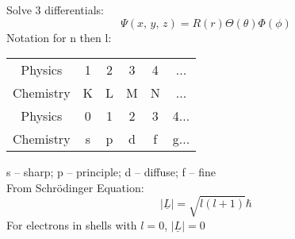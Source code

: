 \documentclass[a4paper, 11pt, fleqn, normalem]{report}
\begin{document}
Solve 3 differentials:
\begin{equation*}
    \Psi(x,\,y,\,z) = R(r)\Theta(\theta)\Phi(\phi)
\end{equation*}
Notation for n then l:
\begin{table}[H]
    \begin{tabular}{c|ccccc}
        Physics   & 1 & 2 & 3 & 4 & ...   \\
        Chemistry & K & L & M & N & ...   \\
        \hline
        \hline
        Physics   & 0 & 1 & 2 & 3 & 4... \\
        Chemistry & s & p & d & f & g...
    \end{tabular}
\end{table}
s -- sharp; p -- principle; d -- diffuse; f -- fine \\
From Schr\"{o}dinger Equation:
\begin{equation*}
    |\underline{L}| = \sqrt{l(l + 1)}\hbar
\end{equation*}
For electrons in shells with $l = 0$, $|\underline{L}| = 0$
\end{document}
